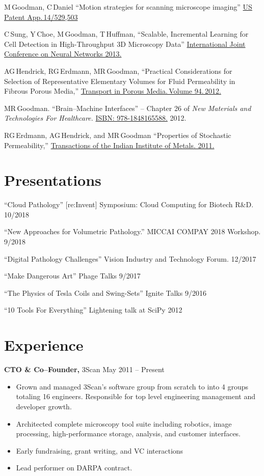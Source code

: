 \documentclass{res}
\begin{document}
\begin{resume}
  M\,Goodman, C\,Daniel
  ``Motion strategies for scanning microscope imaging''
  \href{https://patents.google.com/patent/US20150138532A1/en}{US Patent App.\,14/529,503}

  C\,Sung, Y\,Choe, M\,Goodman, T\,Huffman,
  ``Scalable, Incremental Learning for Cell Detection in High-Throughput 3D Microscopy Data''
  \href{https://doi.org/10.1109/IJCNN.2013.6706769}{International Joint Conference on Neural Networks 2013.}

  AG\,Hendrick, RG\,Erdmann, MR\,Goodman,
  ``Practical Considerations for Selection of Representative
  Elementary Volumes for Fluid Permeability in Fibrous Porous Media,''
  \href{http://dx.doi.org/10.1007/s11242-012-0051-8}{Transport in Porous Media.\,Volume 94.\,2012.}

  MR\,Goodman.
  ``Brain--Machine Interfaces'' -- Chapter 26 of \textit{New Materials and Technologies For Healthcare.}
  \href{http://amzn.com/1848165587}{ISBN: 978-1848165588.} 2012.

  RG\,Erdmann, AG\,Hendrick, and MR\,Goodman
  ``Properties of Stochastic Permeability,''
  \href{http://dx.doi.org/10.1007/s12666-009-0038-5}{Transactions of the Indian Institute of Metals. 2011.}

\section{Presentations}
  ``Cloud Pathology''
  [re:Invent] Symposium: Cloud Computing for Biotech R\&D.  10/2018

  ``New Approaches for Volumetric Pathology.''
  MICCAI COMPAY 2018 Workshop.  9/2018

  ``Digital Pathology Challenges''
  Vision Industry and Technology Forum.  12/2017

  ``Make Dangerous Art''
  Phage Talks 9/2017

  ``The Physics of Tesla Coils and Swing-Sets''
  Ignite Talks 9/2016

  ``10 Tools For Everything''
  Lightening talk at SciPy 2012

\section{Experience}
{\bf CTO \& Co--Founder,} 3Scan \hfill
May 2011 -- Present
\begin{itemize}  \itemsep -2pt
\item Grown and managed 3Scan's software group from scratch to into 4 groups totaling 16 engineers.
  Responsible for top level engineering management and developer growth.
\item Architected complete microscopy tool suite including robotics, image processing,
  high-performance storage, analysis, and customer interfaces.
\item Early fundraising, grant writing, and VC interactions
\item Lead performer on DARPA contract.
\end{itemize}


\end{resume}
\end{document}
